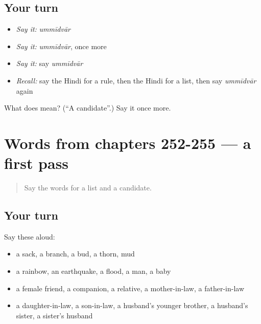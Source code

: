 \subsection*{Your turn}
\begin{itemize}
\raggedright
  \item \emph{Say it:} \emph{ummīdvār}
  \item \emph{Say it:} \emph{ummīdvār}, once more
  \item \emph{Say it:} say \emph{ummīdvār}
  \item \emph{Recall:} say the Hindi for a rule, then the Hindi for a list, then say \emph{ummīdvār} again
\end{itemize}

\begin{tcolorbox}[breakable,colback=teal!4,colframe=teal!35!black,title={Before you move on}]
What does  mean? (\textquotedblleft{}A candidate\textquotedblright{}.) Say it once more.
\end{tcolorbox}
\section[(dialogue)]{Words from chapters 252-255 — a first pass}

\label{lesson:HI-R260-first-pass-words-from-chapters-252-255}



\begin{quote}
Say the words for a list and a candidate.
\end{quote}

\subsection*{Your turn}
Say these aloud:

\begin{itemize}
\raggedright
  \item a sack, a branch, a bud, a thorn, mud
  \item a rainbow, an earthquake, a flood, a man, a baby
  \item a female friend, a companion, a relative, a mother-in-law, a father-in-law
  \item a daughter-in-law, a son-in-law, a husband's younger brother, a husband's sister, a sister's husband
\end{itemize}

